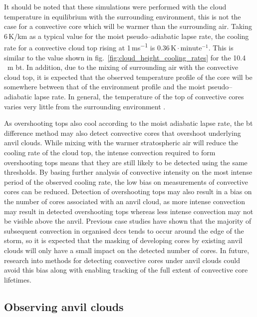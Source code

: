 It should be noted that these simulations were performed with the cloud temperature in equilibrium with the surrounding environment, this is not the case for a convective core which will be warmer than the surrounding air.
Taking 6\,\unit{K/km} as a typical value for the moist pseudo--adiabatic lapse rate, the cooling rate for a convective cloud top rising at 1\,\unit{ms^{-1}} is 0.36\,$\mathrm{K \cdot minute^{-1}}$.
This is similar to the value shown in fig.~\ref{fig:cloud_height_cooling_rates} for the 10.4\,\unit{\mu m} \acrshort{bt}.
In addition, due to the mixing of surrounding air with the convective cloud top, it is expected that the observed temperature profile of the core will be somewhere between that of the environment profile and the moist pseudo--adiabatic lapse rate.
In general, the temperature of the top of convective cores varies very little from the surrounding environment \citep{zipser_cumulonimbus_1980}.

As overshooting tops also cool according to the moist adiabatic lapse rate, the \acrshort{bt} difference method may also detect convective cores that overshoot underlying anvil clouds.
While mixing with the warmer stratospheric air will reduce the cooling rate of the cloud top, the intense convection required to form overshooting tops means that they are still likely to be detected using the same thresholds.
By basing further analysis of convective intensity on the most intense period of the observed cooling rate, the low bias on measurements of convective cores can be reduced.
Detection of overshooting tops may also result in a bias on the number of cores associated with an anvil cloud, as more intense convection may result in detected overshooting tops whereas less intense convection may not be visible above the anvil.
Previous case studies \citep{churchill_development_1984} have shown that the majority of subsequent convection in organised \acrshort{dcc}s tends to occur around the edge of the storm, so it is expected that the masking of developing cores by existing anvil clouds will only have a small impact on the detected number of cores.
In future, research into methods for detecting convective cores under anvil clouds \citep[][e.g.]{apke_relationships_2018} could avoid this bias along with enabling tracking of the full extent of convective core lifetimes.

\subsection{Observing anvil clouds} \label{sec:theory_anvil}

